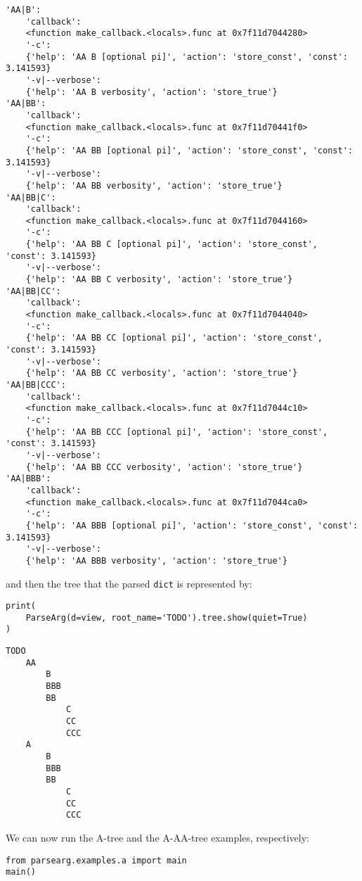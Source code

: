 \documentclass[10pt]{amsart}
\numberwithin{equation}{section}
\begin{document}
\begin{verbatim}
'AA|B':
    'callback':
    <function make_callback.<locals>.func at 0x7f11d7044280>
    '-c':
    {'help': 'AA B [optional pi]', 'action': 'store_const', 'const': 3.141593}
    '-v|--verbose':
    {'help': 'AA B verbosity', 'action': 'store_true'}
'AA|BB':
    'callback':
    <function make_callback.<locals>.func at 0x7f11d70441f0>
    '-c':
    {'help': 'AA BB [optional pi]', 'action': 'store_const', 'const': 3.141593}
    '-v|--verbose':
    {'help': 'AA BB verbosity', 'action': 'store_true'}
'AA|BB|C':
    'callback':
    <function make_callback.<locals>.func at 0x7f11d7044160>
    '-c':
    {'help': 'AA BB C [optional pi]', 'action': 'store_const', 'const': 3.141593}
    '-v|--verbose':
    {'help': 'AA BB C verbosity', 'action': 'store_true'}
'AA|BB|CC':
    'callback':
    <function make_callback.<locals>.func at 0x7f11d7044040>
    '-c':
    {'help': 'AA BB CC [optional pi]', 'action': 'store_const', 'const': 3.141593}
    '-v|--verbose':
    {'help': 'AA BB CC verbosity', 'action': 'store_true'}
'AA|BB|CCC':
    'callback':
    <function make_callback.<locals>.func at 0x7f11d7044c10>
    '-c':
    {'help': 'AA BB CCC [optional pi]', 'action': 'store_const', 'const': 3.141593}
    '-v|--verbose':
    {'help': 'AA BB CCC verbosity', 'action': 'store_true'}
'AA|BBB':
    'callback':
    <function make_callback.<locals>.func at 0x7f11d7044ca0>
    '-c':
    {'help': 'AA BBB [optional pi]', 'action': 'store_const', 'const': 3.141593}
    '-v|--verbose':
    {'help': 'AA BBB verbosity', 'action': 'store_true'}
\end{verbatim}
and then the tree that the parsed \texttt{dict} is represented by:
\begin{verbatim}
print(
    ParseArg(d=view, root_name='TODO').tree.show(quiet=True)
)
\end{verbatim}

\begin{verbatim}
TODO
    AA
        B
        BBB
        BB
            C
            CC
            CCC
    A
        B
        BBB
        BB
            C
            CC
            CCC
\end{verbatim}


We can now run the A-tree and the A-AA-tree examples, respectively:
\begin{verbatim}
from parsearg.examples.a import main
main()
\end{verbatim}
\end{document}
